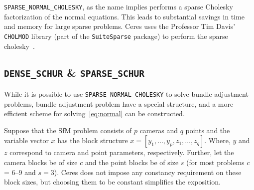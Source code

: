 \texttt{SPARSE\_NORMAL\_CHOLESKY}, as the name implies performs a
sparse Cholesky factorization of the normal equations. This leads to
substantial savings in time and memory for large sparse
problems. Ceres uses the Professor Tim Davis' \texttt{CHOLMOD} library (part of the \texttt{SuiteSparse} package) to perform the sparse cholesky~\cite{chen2006acs}.

\subsection{\texttt{DENSE\_SCHUR} \& \texttt{SPARSE\_SCHUR}}
While it is possible to use \texttt{SPARSE\_NORMAL\_CHOLESKY} to solve bundle adjustment problems, bundle adjustment problem have a special structure, and a more efficient scheme for solving~\eqref{eq:normal} can be constructed.

Suppose that the SfM problem consists of $p$ cameras and $q$ points and the variable vector $x$ has the  block structure $x = [y_{1},\hdots,y_{p},z_{1},\hdots,z_{q}]$. Where, $y$ and $z$ correspond to camera and point parameters, respectively.  Further, let the camera blocks be of size $c$ and the point blocks be of size $s$ (for most problems $c$ =  $6$--$9$ and $s = 3$). Ceres does not impose any constancy requirement on these block sizes, but choosing them to be constant simplifies the exposition.

